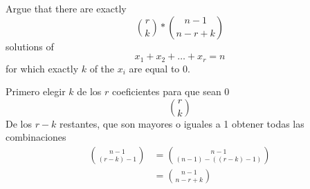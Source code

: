 \item Argue that there are exactly
\[ \binom{r}{k} * \binom{n-1}{n-r+k} \]
solutions of
\[ x_1 + x_2 + \dots + x_r = n \]
for which exactly $k$ of the $x_i$ are equal to 0.

Primero elegir $k$ de los $r$ coeficientes para que sean 0
\[ \binom{r}{k} \]
De los $r-k$ restantes, que son mayores o iguales a 1 obtener todas las combinaciones
\begin{align*}
    \binom{n-1}{(r-k)-1} &= \binom{n-1}{(n-1)-((r-k)-1)}\\
    &= \binom{n-1}{n-r+k}
\end{align*}